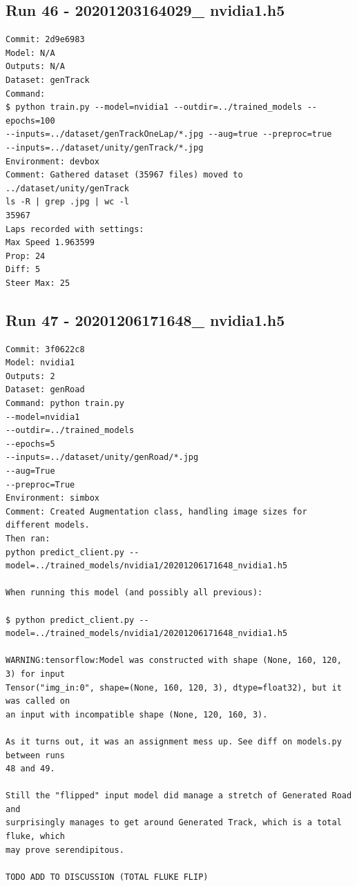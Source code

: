 \subsection{Run 46 - 20201203164029\_ nvidia1.h5}
\label{app_res:46}
\begin{verbatim}
Commit: 2d9e6983
Model: N/A
Outputs: N/A
Dataset: genTrack
Command: 
$ python train.py --model=nvidia1 --outdir=../trained_models --epochs=100
--inputs=../dataset/genTrackOneLap/*.jpg --aug=true --preproc=true
--inputs=../dataset/unity/genTrack/*.jpg
Environment: devbox
Comment: Gathered dataset (35967 files) moved to ../dataset/unity/genTrack
ls -R | grep .jpg | wc -l
35967
Laps recorded with settings:
Max Speed 1.963599
Prop: 24
Diff: 5
Steer Max: 25
\end{verbatim}

\subsection{Run 47 - 20201206171648\_ nvidia1.h5}
\label{app_res:47}
\begin{verbatim}
Commit: 3f0622c8
Model: nvidia1
Outputs: 2
Dataset: genRoad
Command: python train.py
--model=nvidia1
--outdir=../trained_models
--epochs=5
--inputs=../dataset/unity/genRoad/*.jpg
--aug=True
--preproc=True
Environment: simbox
Comment: Created Augmentation class, handling image sizes for different models.
Then ran:
python predict_client.py --model=../trained_models/nvidia1/20201206171648_nvidia1.h5

When running this model (and possibly all previous):

$ python predict_client.py --model=../trained_models/nvidia1/20201206171648_nvidia1.h5

WARNING:tensorflow:Model was constructed with shape (None, 160, 120, 3) for input
Tensor("img_in:0", shape=(None, 160, 120, 3), dtype=float32), but it was called on
an input with incompatible shape (None, 120, 160, 3).

As it turns out, it was an assignment mess up. See diff on models.py between runs 
48 and 49.

Still the "flipped" input model did manage a stretch of Generated Road and
surprisingly manages to get around Generated Track, which is a total fluke, which
may prove serendipitous.

TODO ADD TO DISCUSSION (TOTAL FLUKE FLIP)
\end{verbatim}



